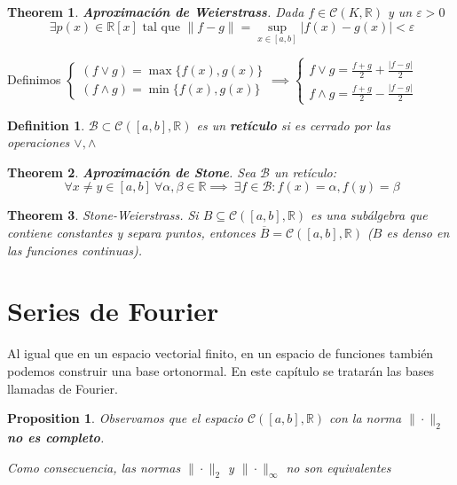 \documentclass[leqno]{article}
\newtheorem*{definition}{Definition}
\newtheorem*{theorem}{Theorem}
\newtheorem*{proposition}{Proposition}
\begin{document}
\begin{theorem}
\textbf{Aproximación de Weierstrass}. Dada $f\in \mathcal{C}(K, \mathbb{R})$ y un $\varepsilon >0$
\[
\ \exists  p(x) \in \mathbb{R}[x] \text{ tal que } \|f-g\|=\sup_{x\in [a, b]}|f(x)-g(x)|<\varepsilon 
\] 
\end{theorem}

Definimos $\begin{cases}
  (f\vee g) = \max\{f(x), g(x)\} \\
  (f\wedge g) = \min\{f(x), g(x)\} 
\end{cases}  \implies \begin{cases}
  f\vee g = \frac{f+g}{2}+\frac{|f-g|}{2} \\ 
  f\wedge g= \frac{f+g}{2}-\frac{|f-g|}{2}
\end{cases}$ 

\begin{definition}
$\mathcal{B}\subset \mathcal{C}([a, b], \mathbb{R})$ es un \textbf{retículo} si es cerrado por las operaciones $\vee, \wedge$
\end{definition}

\begin{theorem}
\textbf{Aproximación de Stone}. Sea $\mathcal{B}$ un retículo:
\[
\ \forall x\neq y \in [a,b] \ \forall \alpha , \beta \in \mathbb{R} \implies \ \exists f\in \mathcal{B} : f(x) = \alpha , f(y)=\beta 
\] 
\end{theorem}

\begin{theorem}
Stone-Weierstrass. Si $B\subseteq \mathcal{C}([a,b], \mathbb{R})$ es una subálgebra que contiene constantes y separa puntos, entonces $\overline{B} = \mathcal{C}([a,b], \mathbb{R})$ ($B$ es denso en las funciones continuas).
\end{theorem}


\section{Series de Fourier}
Al igual que en un espacio vectorial finito, en un espacio de funciones también podemos construir una base ortonormal. En este capítulo se tratarán las bases llamadas de Fourier.

\begin{proposition}
Observamos que el espacio $\mathcal{C}([a, b], \mathbb{R})$ con la norma $\|\cdot\|_{2}$ \textbf{no es completo}.

Como consecuencia, las normas $\|\cdot \|_2$ y $\|\cdot\|_\infty$ no son equivalentes
\end{proposition}
\end{document}
